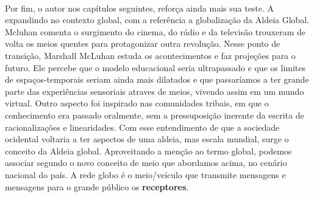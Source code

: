 \documentclass[12pt,a4paper]{article}
\begin{document}
\paragraph{}
Por fim, o autor nos capítulos seguintes,  reforça ainda mais sua teste. A expandindo no contexto global, com a referência a globalização da Aldeia Global.
Mcluhan comenta o surgimento do cinema, do rádio e da televisão trouxeram de volta os meios quentes para protagonizar outra revolução. Nesse ponto de transição, Marshall McLuhan\cite{wiki:marshall_mcluhan} estuda os acontecimentos e faz projeções para o futuro. 
Ele percebe que o modelo educacional seria ultrapassado e que os limites de espaços-temporais seriam ainda mais dilatados e que passaríamos a ter grande parte das experiências sensoriais atraves
de meios, vivendo assim em um mundo virtual. Outro aspecto foi inspirado nas comunidades tribais, em que o conhecimento era passado oralmente, sem a pressuposição inerente da escrita de racionalizações e linearidades. Com esse entendimento de que a sociedade ocidental voltaria a ter aspectos de uma aldeia, mas escala mundial, surge o conceito da Aldeia global.
Aproveitando a menção ao termo global, podemos associar segundo o novo conceito de meio que abordamos acima, no cenário nacional do país. A rede globo é o meio/veículo que transmite mensagens e mensagens para o grande público os \textbf{receptores}.
 


 
\end{document}
